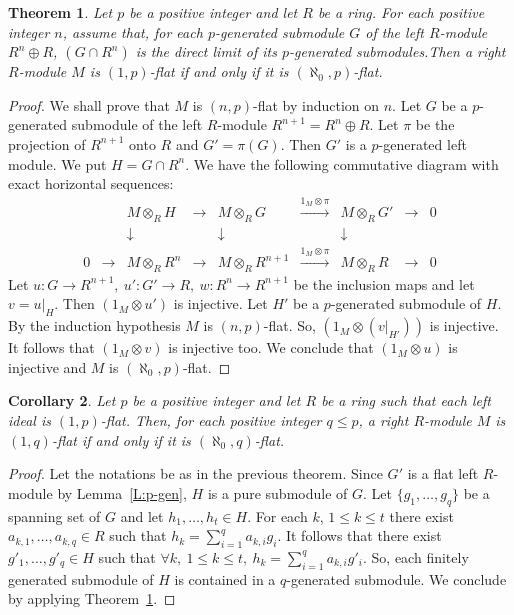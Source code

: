 \documentclass{amsart}
\newtheorem{theorem}{Theorem}[section]
\newtheorem{corollary}[theorem]{Corollary}
\begin{document}
\begin{theorem}
\label{T:p-flatideal} Let $p$ be a positive integer and let $R$ be a ring. For each positive integer $n$, assume that, for each $p$-generated submodule $G$ of the left $R$-module $R^n\oplus R$, $(G\cap R^n)$ is the direct limit of its $p$-generated submodules.Then a right $R$-module $M$ is $(1,p)$-flat if and only if it is $(\aleph_0,p)$-flat.
\end{theorem}
\begin{proof}
We shall prove that $M$ is $(n,p)$-flat by induction on $n$. Let $G$ be a $p$-generated submodule of the left $R$-module $R^{n+1}=R^n\oplus R$. Let $\pi$ be the projection of $R^{n+1}$ onto $R$ and $G'=\pi(G)$. Then $G'$ is a $p$-generated left module. We put $H=G\cap R^n$.
We have the following commutative diagram with exact horizontal sequences:
\[\begin{matrix}
{} & {} & M\otimes_RH &\rightarrow & M\otimes_RG &\xrightarrow{1_M\otimes\pi} & M\otimes_RG'& \rightarrow & 0\\
{} & {} & \downarrow & {} & \downarrow & {} & \downarrow & {} & {} \\
0 & \rightarrow & M\otimes_R R^n &\rightarrow & M\otimes_RR^{n+1} &\xrightarrow{1_M\otimes\pi} & M\otimes_RR& \rightarrow & 0
\end{matrix}\]
Let $u:G\rightarrow R^{n+1},\ u':G'\rightarrow R,\ w:R^n\rightarrow R^{n+1}$ be the inclusion maps and let $v=u\vert_{H}$. Then $(1_M\otimes u')$ is injective. Let $H'$ be a $p$-generated submodule of $H$. By the induction hypothesis  $M$ is $(n,p)$-flat. So, $(1_M\otimes(v\vert_{H'}))$ is injective. It follows that $(1_M\otimes v)$ is injective too. We conclude that $(1_M\otimes u)$ is injective and $M$ is $(\aleph_0,p)$-flat.
\end{proof}

\begin{corollary}
\label{C:p-flatideal} Let $p$ be a positive integer and let $R$ be a ring such that each left ideal is $(1,p)$-flat. Then, for each positive integer $q\leq p$, a right $R$-module $M$ is $(1,q)$-flat if and only if it is $(\aleph_0,q)$-flat.
\end{corollary}
\begin{proof}
Let the notations be as in the previous theorem. Since $G'$ is a flat left $R$-module by Lemma~\ref{L:p-gen}, $H$ is a pure submodule of $G$. Let $\{g_1,\dots,g_q\}$ be a spanning set of $G$ and let $h_1,\dots,h_t\in H$. For each $k$, $1\leq k\leq t$ there exist $a_{k,1},\dots,a_{k,q}\in R$ such that $h_k=\sum_{i=1}^qa_{k,i}g_i$. It follows that there exist $g'_1,\dots,g'_q\in H$ such that $\forall k,\ 1\leq k\leq t,\ h_k=\sum_{i=1}^qa_{k,i}g'_i$. So, each finitely generated submodule of $H$ is contained in a $q$-generated submodule. We conclude by applying Theorem~\ref{T:p-flatideal}.
\end{proof}
\end{document}
